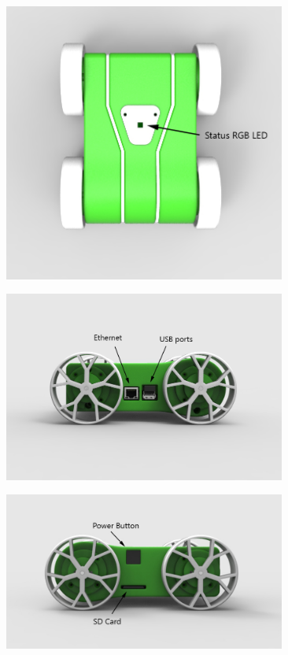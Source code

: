 \documentclass[12pt,titlepage,oneside]{memoir}
\begin{document}
\begin{figure}[!htbp]
\includegraphics[width=350px]{render/pibottop.jpg}
\centering
\end{figure}

\begin{figure}[!htbp]
\includegraphics[width=350px]{render/pibotstarboard.jpg}
\centering
\end{figure}

\begin{figure}[!htbp]
\includegraphics[width=350px]{render/pibotport.jpg}
\centering
\end{figure}
\end{document}
